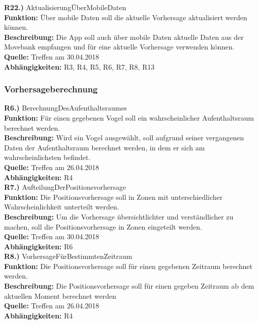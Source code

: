 \documentclass[12pt]{article} %
\begin{document}
\textbf{R22.)} AktualisierungÜberMobileDaten \\
\textbf{Funktion:} Über mobile Daten soll die aktuelle Vorhersage aktualisiert werden können. \\
\textbf{Beschreibung:} Die App soll auch über mobile Daten aktuelle Daten aus der Movebank empfangen und für eine aktuelle Vorhersage verwenden können. \\
\textbf{Quelle:} Treffen am 30.04.2018 \\
\textbf{Abhängigkeiten:} R3, R4, R5, R6, R7, R8, R13 \\

\subsubsection{Vorhersageberechnung}

\textbf{R6.)} BerechnungDesAufenthaltsraumes \\
\textbf{Funktion:} Für einen gegebenen Vogel soll ein wahrscheinlicher Aufenthaltsraum berechnet werden. \\
\textbf{Beschreibung:} Wird ein Vogel ausgewählt, soll aufgrund seiner vergangenen Daten der Aufenthaltsraum berechnet werden, in dem er sich am wahrscheinlichsten befindet. \\
\textbf{Quelle:} Treffen am 26.04.2018 \\
\textbf{Abhängigkeiten:} R4 \\

\textbf{R7.)} AufteilungDerPositionsvorhersage \\
\textbf{Funktion:} Die Positionsvorhersage soll in Zonen mit unterschiedlicher Wahrscheinlichkeit unterteilt werden. \\
\textbf{Beschreibung:} Um die Vorhersage übersichtlichter und verständlicher zu machen, soll die Positionsvorhersage in Zonen eingeteilt werden.  \\
\textbf{Quelle:} Treffen am 30.04.2018 \\
\textbf{Abhängigkeiten:} R6 \\

\textbf{R8.)} VorhersageFürBestimmtenZeitraum \\
\textbf{Funktion:} Die Positionsvorhersage soll für einen gegebenen Zeitraum berechnet werden. \\
\textbf{Beschreibung:} Die Positionsvorhersage soll für einen gegeben Zeitraum ab dem aktuellen Moment berechnet werden \\
\textbf{Quelle:} Treffen am 26.04.2018 \\
\textbf{Abhängigkeiten:} R4 \\
\end{document}
